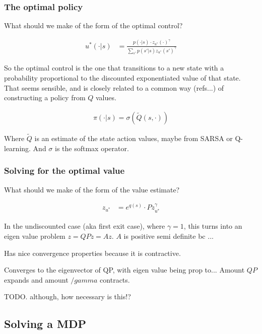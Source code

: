 \subsubsection{The optimal policy}

What should we make of the form of the optimal control?

\begin{align*}
u^{* }(\cdot | s) &= \frac{p(\cdot | s)\cdot z_{u^{* }}(\cdot)^{\gamma}}{\sum_{s'} p(s' | s) z_{u^{* }}(s')^{\gamma}}
\end{align*}

So the optimal control is the one that transitions to a new state with a
probability proportional to the discounted exponentiated value of that state.
That seems sensible, and is closely related to a common way (refs...) of constructing a policy from $Q$ values.

\begin{align*}
\pi(\cdot|s) = \sigma(\tilde Q(s, \cdot))
\end{align*}

Where $\tilde Q$ is an estimate of the state action values, maybe from SARSA or Q-learning.
And $\sigma$ is the softmax operator.

\subsubsection{Solving for the optimal value}

What should we make of the form of the value estimate?

\begin{align*}
z_{u^{* }} &= e^{q(s)}\cdot P z_{u^{* }}^{\gamma}
\end{align*}

In the undiscounted case (aka first exit case), where $\gamma=1$, this turns
into an eigen value problem $z = QPz = Az$.
$A$ is positive semi definite bc ...

Has nice convergence properties because it is contractive.

Converges to the eigenvector of QP, with eigen value being prop to...
Amount $QP$ expands and amount $/gamma$ contracts.

{\color{red}TODO. although, how necessary is this!?}

\subsection{Solving a MDP}

